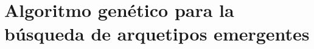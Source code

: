 
\chapter{Algoritmo genético para la búsqueda de arquetipos emergentes}
\label{cha:genetic_algorithm}


